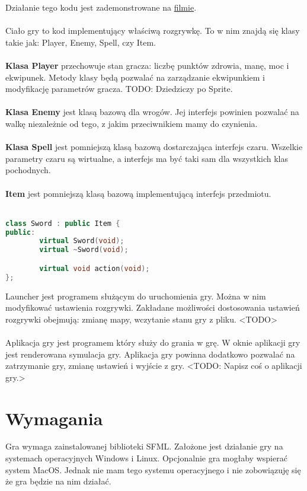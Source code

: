 \documentclass[12pt, titlepage]{article}
\begin{document}
\noindent
Działanie tego kodu jest zademonstrowane
na
\href{https://gitlab-stud.elka.pw.edu.pl/aprzyby2/proi_projekt/-/blob/bcad75a44615c7e19fda7ad53a3b5c0541fd482f/docs/project-docs/rc/demo.webm}{filmie}.
\\~\\
Ciało gry to kod implementujący właściwą
rozgrywkę. To w nim znajdą się klasy takie
jak: Player, Enemy, Spell, czy Item.
\\~\\
\textbf{Klasa Player} przechowuje
stan gracza: liczbę punktów zdrowia, manę,
moc i ekwipunek. Metody klasy
będą pozwalać na zarządzanie ekwipunkiem i
modyfikację parametrów gracza.
TODO: Dziedziczy po Sprite.
\\~\\
\textbf{Klasa Enemy} jest klasą bazową
dla wrogów. Jej interfejs powinien
pozwalać na walkę niezależnie od tego,
z jakim przeciwnikiem mamy do czynienia.
\\~\\
\textbf{Klasa Spell} jest pomniejszą
klasą
bazową dostarczająca interfejs czaru.
Wszelkie parametry czaru są wirtualne,
a interfejs ma być taki sam dla wszystkich
klas pochodnych.
\\~\\
\textbf{Item} jest pomniejszą klasą
bazową implementującą interfejs
przedmiotu.
\\~
\begin{lstlisting}[language=C++, caption=Klasa "`Sword"' - kod poglądowy]
class Sword : public Item {
public:
        virtual Sword(void);
        virtual ~Sword(void);

        virtual void action(void);
};
\end{lstlisting}

\noindent
Launcher jest programem służącym do uruchomienia gry.
Można w nim modyfikować ustawienia rozgrywki. Zakładane
możliwości dostosowania ustawień rozgrywki obejmują:
zmianę mapy, wczytanie stanu gry z pliku. <TODO>
\\~\\
Aplikacja gry jest programem który służy
do grania w grę. W oknie aplikacji gry jest
renderowana symulacja gry. Aplikacja gry
powinna dodatkowo pozwalać na zatrzymanie
gry, zmianę ustawień i wyjście z gry. <TODO:
Napisz coś o aplikacji gry.>

\section{Wymagania}
Gra wymaga zainstalowanej biblioteki
SFML. Założone jest działanie gry
na systemach operacyjnych Windows i
Linux. Opcjonalnie gra mogłaby wspierać
system MacOS. Jednak nie mam tego
systemu operacyjnego i nie zobowiązuję
się że gra będzie na nim działać.
\end{document}
